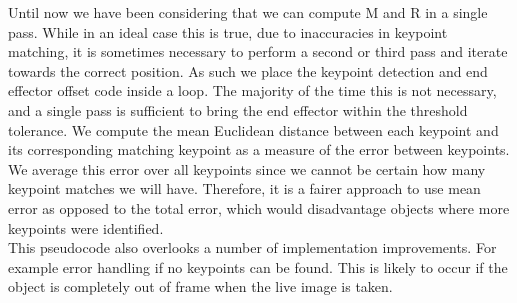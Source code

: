 Until now we have been considering that we can compute M and R in a single pass. While in an ideal case this is true, due to inaccuracies in keypoint matching, it is sometimes necessary to perform a second or third pass and iterate towards the correct position. As such we place the keypoint detection and end effector offset code inside a loop. The majority of the time this is not necessary, and a single pass is sufficient to bring the end effector within the threshold tolerance. We compute the mean Euclidean distance between each keypoint and its corresponding matching keypoint as a measure of the error between keypoints. We average this error over all keypoints since we cannot be certain how many keypoint matches we will have. Therefore, it is a fairer approach to use mean error as opposed to the total error, which would disadvantage objects where more keypoints were identified.\\

This pseudocode also overlooks a number of implementation improvements. For example error handling if no keypoints can be found. This is likely to occur if the object is completely out of frame when the live image is taken.







